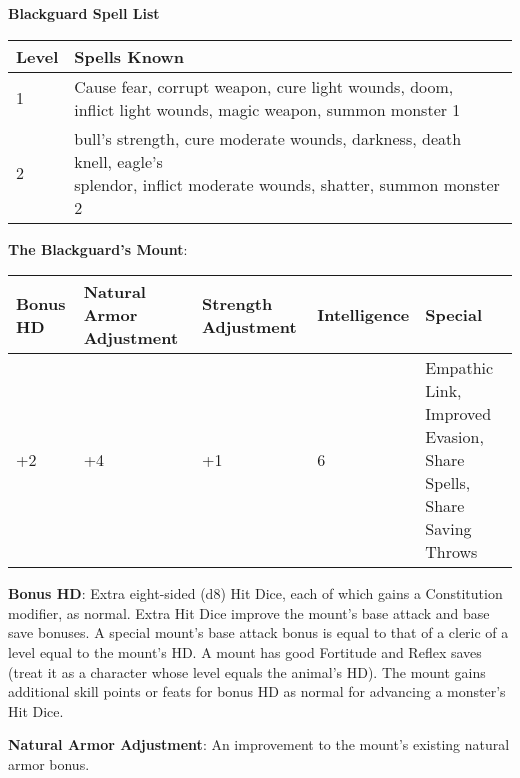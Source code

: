 \textbf{\large{Blackguard Spell List}}

\begin{center}
\begin{adjustwidth}{-4cm}{}
\begin{small}
\begin{tabular}{| l | l |}
\hline
Level &Spells Known \\
\hline
1 &\makecell{Cause fear, corrupt weapon, cure light wounds, doom,\\ inflict light wounds, magic weapon, summon monster 1} \\
2 &\makecell{bull's strength, cure moderate wounds, darkness, death knell, eagle's\\ splendor, inflict moderate wounds, shatter, summon monster 2} \\
\hline
\end{tabular}
\end{small}
\end{adjustwidth}
\end{center}

\textbf{The Blackguard's Mount}:

\begin{center}
\begin{adjustwidth}{-4cm}{}
\begin{small}
\begin{tabular}{| l | l | l | l | l |}
\hline
Bonus HD &Natural Armor Adjustment &Strength Adjustment &Intelligence &Special \\
\hline
+2 &+4 &+1 &6 &\makecell{Empathic Link, Improved Evasion,\\ Share Spells, Share Saving Throws} \\
\hline
\end{tabular}
\end{small}
\end{adjustwidth}
\end{center}

\textbf{Bonus HD}: Extra eight-sided (d8) Hit Dice, each of which gains a Constitution modifier, as normal. Extra Hit Dice improve the mount's base attack and base save bonuses. A special mount's base attack bonus is equal to that of a cleric of a level equal to the mount's HD. A mount has good Fortitude and Reflex saves (treat it as a character whose level equals the animal's HD). The mount gains additional skill points or feats for bonus HD as normal for advancing a monster's Hit Dice.

\textbf{Natural Armor Adjustment}: An improvement to the mount's existing natural armor bonus.

